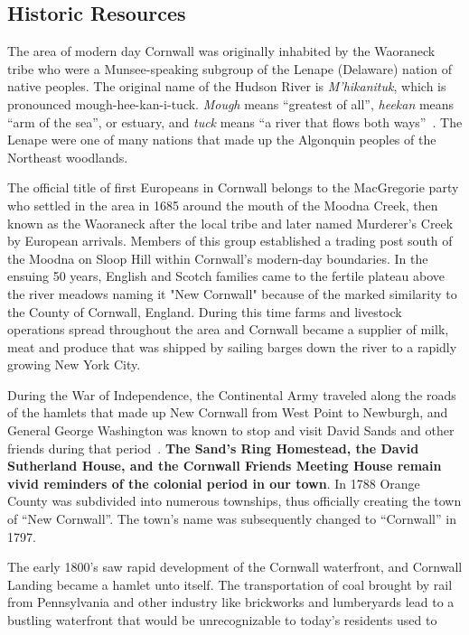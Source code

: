 \subsection*{Historic Resources}\label{subsec:historic}
The area of modern day Cornwall was originally inhabited by the Waoraneck tribe 
who were a Munsee-speaking subgroup of the Lenape (Delaware) nation of native 
peoples. The original name of the Hudson River is \textit{M’hikanituk}, which is 
pronounced mough-hee-kan-i-tuck. \textit{Mough} means ``greatest of all'', 
\textit{heekan} means ``arm of the sea'', or estuary, and \textit{tuck} means
``a river that flows both 
ways''~\citep{stonypointcenter}. The Lenape were one of many nations that made 
up the Algonquin peoples of the Northeast woodlands.
\par
The official title of first Europeans in Cornwall belongs to the MacGregorie 
party who settled in the area in 1685 around the mouth of the Moodna Creek, 
then known as the Waoraneck after the local tribe and later named Murderer's 
Creek by European arrivals. Members of this group established a trading post 
south of the Moodna on Sloop Hill within Cornwall's modern-day boundaries. In 
the ensuing 50 years, English and Scotch families came to the fertile plateau 
above the river meadows naming it "New Cornwall" because of the marked 
similarity to the County of Cornwall, England. During this time farms and 
livestock operations spread throughout the area and Cornwall became a supplier 
of milk, meat and produce that was shipped by sailing barges down the river to a 
rapidly growing New York City.
\par
During the War of Independence, the Continental Army traveled along the roads 
of the hamlets that made up New Cornwall from West Point to Newburgh, and 
General George Washington was known to stop and visit David Sands and other 
friends during that period~\citep{townofcornwall}. \textbf{The Sand’s Ring Homestead,
the David Sutherland House, and the Cornwall Friends Meeting House remain vivid 
reminders of the colonial period in our town}. In 1788 Orange County was subdivided
into numerous townships, thus officially creating the town of ``New Cornwall''. 
The town's name was subsequently changed to ``Cornwall'' in 1797.
\par
The early 1800's saw rapid development of the Cornwall waterfront, and Cornwall 
Landing became a hamlet unto itself. The transportation of coal brought by rail 
from Pennsylvania and other industry like brickworks and lumberyards lead to a 
bustling waterfront that would be unrecognizable to today's residents used to 
